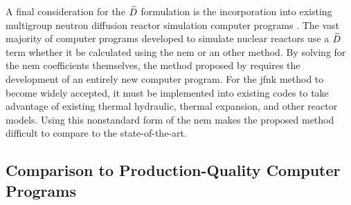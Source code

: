    A final consideration for the $\widetilde{D}$ formulation is the incorporation
    into existing multigroup neutron diffusion reactor simulation computer
    programs \cite{casmo4,simulate3,mpact}. The vast majority of computer
    programs developed to simulate nuclear reactors use a $\widetilde{D}$ term whether
    it be calculated using the \gls{nem} or an other method. By solving for the
    \gls{nem} coefficients themselves, the method proposed by
    \citeauthor{qe2paper} requires the development of an entirely new computer
    program. For the \gls{jfnk} method to become widely accepted, it must be
    implemented into existing codes to take advantage of existing thermal
    hydraulic, thermal expansion, and other reactor models. Using this
    nonstandard form of the \gls{nem} makes the proposed method difficult to
    compare to the state-of-the-art.

  \subsection{Comparison to Production-Quality Computer Programs}

